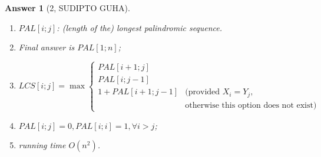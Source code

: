 \documentclass[11pt]{article}
\theoremstyle{numberplain}
\theoremstyle{nonumberplain}
\newtheorem{ans}{Answer}
\newcommand{\0}{{\mathbf{0}}}
\begin{document}
\begin{ans}[2, SUDIPTO GUHA]
\begin{enumerate}
\item $PAL[i; j]$: (length of the) longest palindromic sequence.
\item Final answer is $PAL[1;n]$;
\item $LCS[i; j] = \max \left\{
\begin{array}{cc}
PAL[i +1; j]\\
PAL[i; j -1]\\
1 + PAL[i +1; j -1] &\text{(provided }X_i = Y_j, \\
&\text{otherwise this option does not exist)}
\end{array}
\right.
$
\item $PAL[i; j] = 0, PAL[i;i]=1,\forall i> j$;
\item running time $O(n^2)$.
\end{enumerate}
\end{ans}
\end{document}
